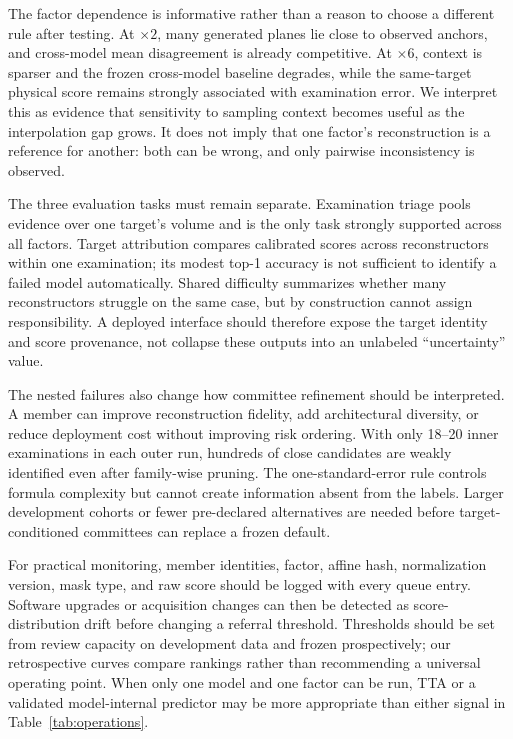 \documentclass{article}
\begin{document}
The factor dependence is informative rather than a reason to choose a different rule after testing. At $\times2$, many generated planes lie close to observed anchors, and cross-model mean disagreement is already competitive. At $\times6$, context is sparser and the frozen cross-model baseline degrades, while the same-target physical score remains strongly associated with examination error. We interpret this as evidence that sensitivity to sampling context becomes useful as the interpolation gap grows. It does not imply that one factor's reconstruction is a reference for another: both can be wrong, and only pairwise inconsistency is observed.

The three evaluation tasks must remain separate. Examination triage pools evidence over one target's volume and is the only task strongly supported across all factors. Target attribution compares calibrated scores across reconstructors within one examination; its modest top-1 accuracy is not sufficient to identify a failed model automatically. Shared difficulty summarizes whether many reconstructors struggle on the same case, but by construction cannot assign responsibility. A deployed interface should therefore expose the target identity and score provenance, not collapse these outputs into an unlabeled ``uncertainty'' value.

The nested failures also change how committee refinement should be interpreted. A member can improve reconstruction fidelity, add architectural diversity, or reduce deployment cost without improving risk ordering. With only 18--20 inner examinations in each outer run, hundreds of close candidates are weakly identified even after family-wise pruning. The one-standard-error rule controls formula complexity but cannot create information absent from the labels. Larger development cohorts or fewer pre-declared alternatives are needed before target-conditioned committees can replace a frozen default.

For practical monitoring, member identities, factor, affine hash, normalization version, mask type, and raw score should be logged with every queue entry. Software upgrades or acquisition changes can then be detected as score-distribution drift before changing a referral threshold. Thresholds should be set from review capacity on development data and frozen prospectively; our retrospective curves compare rankings rather than recommending a universal operating point. When only one model and one factor can be run, TTA or a validated model-internal predictor may be more appropriate than either signal in Table~\ref{tab:operations}.
\end{document}
